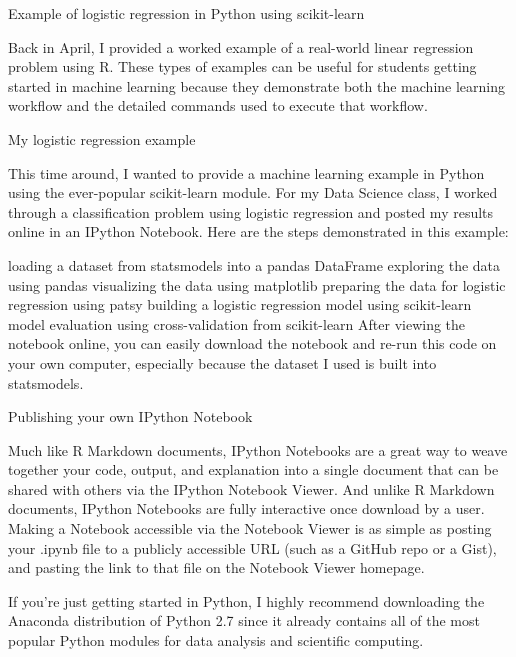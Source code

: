 
Example of logistic regression in Python using scikit-learn

Back in April, I provided a worked example of a real-world linear regression problem using R. These types of examples can be useful for students getting started in machine learning because they demonstrate both the machine learning workflow and the detailed commands used to execute that workflow.

My logistic regression example

This time around, I wanted to provide a machine learning example in Python using the ever-popular scikit-learn module. For my Data Science class, I worked through a classification problem using logistic regression and posted my results online in an IPython Notebook. Here are the steps demonstrated in this example:

loading a dataset from statsmodels into a pandas DataFrame
exploring the data using pandas
visualizing the data using matplotlib
preparing the data for logistic regression using patsy
building a logistic regression model using scikit-learn
model evaluation using cross-validation from scikit-learn
After viewing the notebook online, you can easily download the notebook and re-run this code on your own computer, especially because the dataset I used is built into statsmodels.

Publishing your own IPython Notebook

Much like R Markdown documents, IPython Notebooks are a great way to weave together your code, output, and explanation into a single document that can be shared with others via the IPython Notebook Viewer. And unlike R Markdown documents, IPython Notebooks are fully interactive once download by a user. Making a Notebook accessible via the Notebook Viewer is as simple as posting your .ipynb file to a publicly accessible URL (such as a GitHub repo or a Gist), and pasting the link to that file on the Notebook Viewer homepage.

If you're just getting started in Python, I highly recommend downloading the Anaconda distribution of Python 2.7 since it already contains all of the most popular Python modules for data analysis and scientific computing.
